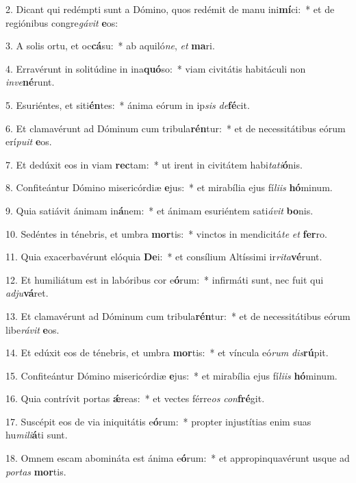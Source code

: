 2. Dicant qui redémpti sunt a Dómino, quos redémit de manu ini\textbf{mí}ci:~*  et de regiónibus congre\textit{gá}\textit{vit} \textbf{e}os:\

3. A solis ortu, et oc\textbf{cá}su:~*  ab aquiló\textit{ne}, \textit{et} \textbf{ma}ri.\

4. Erravérunt in solitúdine in ina\textbf{quó}so:~*  viam civitátis habitáculi non \textit{in}\textit{ve}\textbf{né}runt.\

5. Esuriéntes, et siti\textbf{én}tes:~*  ánima eórum in ip\textit{sis} \textit{de}\textbf{fé}cit.\

6. Et clamavérunt ad Dóminum cum tribula\textbf{rén}tur:~*  et de necessitátibus eórum erí\textit{pu}\textit{it} \textbf{e}os.\

7. Et dedúxit eos in viam \textbf{rec}tam:~*  ut irent in civitátem habi\textit{ta}\textit{ti}\textbf{ó}nis.\

8. Confiteántur Dómino misericórdiæ \textbf{e}jus:~*  et mirabília ejus fí\textit{li}\textit{is} \textbf{hó}minum.\

9. Quia satiávit ánimam in\textbf{á}nem:~*  et ánimam esuriéntem sati\textit{á}\textit{vit} \textbf{bo}nis.\

10. Sedéntes in ténebris, et umbra \textbf{mor}tis:~*  vinctos in mendicitá\textit{te} \textit{et} \textbf{fer}ro.\

11. Quia exacerbavérunt elóquia \textbf{De}i:~*  et consílium Altíssimi ir\textit{ri}\textit{ta}\textbf{vé}runt.\

12. Et humiliátum est in labóribus cor e\textbf{ó}rum:~*  infirmáti sunt, nec fuit qui \textit{ad}\textit{ju}\textbf{vá}ret.\

13. Et clamavérunt ad Dóminum cum tribula\textbf{rén}tur:~*  et de necessitátibus eórum libe\textit{rá}\textit{vit} \textbf{e}os.\

14. Et edúxit eos de ténebris, et umbra \textbf{mor}tis:~*  et víncula eó\textit{rum} \textit{dis}\textbf{rú}pit.\

15. Confiteántur Dómino misericórdiæ \textbf{e}jus:~*  et mirabília ejus fí\textit{li}\textit{is} \textbf{hó}minum.\

16. Quia contrívit portas \textbf{ǽ}reas:~*  et vectes férre\textit{os} \textit{con}\textbf{fré}git.\

17. Suscépit eos de via iniquitátis e\textbf{ó}rum:~*  propter injustítias enim suas hu\textit{mi}\textit{li}\textbf{á}ti sunt.\

18. Omnem escam abomináta est ánima e\textbf{ó}rum:~*  et appropinquavérunt usque ad \textit{por}\textit{tas} \textbf{mor}tis.\

